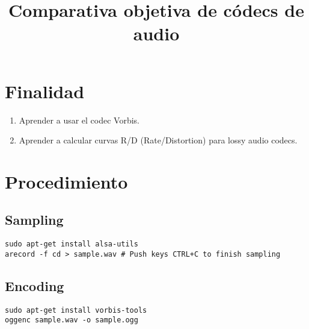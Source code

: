 \title{Comparativa objetiva de c\'odecs de audio}

\maketitle
\tableofcontents

\section{Finalidad}

\begin{enumerate}
\item Aprender a usar el codec Vorbis.
\item Aprender a calcular curvas R/D (Rate/Distortion) para lossy
  audio codecs.
\end{enumerate}


\section{Procedimiento}

\subsection{Sampling}

\begin{lstlisting}
sudo apt-get install alsa-utils
arecord -f cd > sample.wav # Push keys CTRL+C to finish sampling 
\end{lstlisting}


\subsection{Encoding}

\begin{lstlisting}
sudo apt-get install vorbis-tools
oggenc sample.wav -o sample.ogg
\end{lstlisting}

